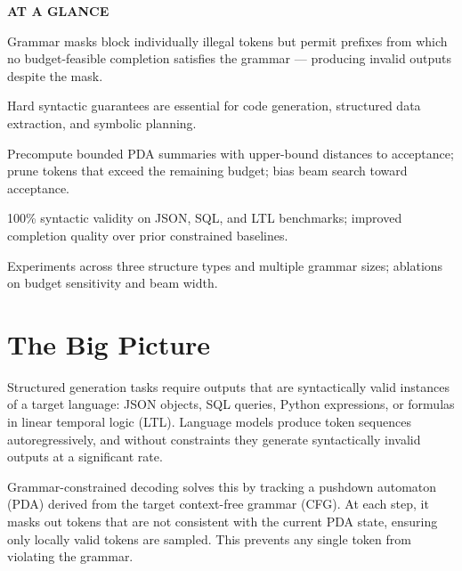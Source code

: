 \documentclass[10pt,twocolumn]{article}
\begin{document}
\begin{mdframed}[backgroundcolor=boxgray,linecolor=rulered,linewidth=1pt,
    innerleftmargin=6pt,innerrightmargin=6pt,
    innertopmargin=6pt,innerbottommargin=6pt]
\textbf{\small AT A GLANCE}\par\vspace{4pt}
\begin{description}[leftmargin=0pt,labelsep=4pt,itemsep=2pt,parsep=0pt,
    font=\small\bfseries]
  \item[Problem:] Grammar masks block individually illegal tokens but
    permit prefixes from which no budget-feasible completion satisfies
    the grammar — producing invalid outputs despite the mask.
  \item[Why it matters:] Hard syntactic guarantees are essential for
    code generation, structured data extraction, and symbolic planning.
  \item[Method:] Precompute bounded PDA summaries with upper-bound
    distances to acceptance; prune tokens that exceed the remaining
    budget; bias beam search toward acceptance.
  \item[Result:] 100\% syntactic validity on JSON, SQL, and LTL
    benchmarks; improved completion quality over prior constrained
    baselines.
  \item[Evidence:] Experiments across three structure types and
    multiple grammar sizes; ablations on budget sensitivity and beam width.
\end{description}
\end{mdframed}

\section{The Big Picture}

Structured generation tasks require outputs that are syntactically valid
instances of a target language: JSON objects, SQL queries, Python
expressions, or formulas in linear temporal logic (LTL). Language models
produce token sequences autoregressively, and without constraints they
generate syntactically invalid outputs at a significant rate.

Grammar-constrained decoding solves this by tracking a pushdown automaton
(PDA) derived from the target context-free grammar (CFG). At each step, it
masks out tokens that are not consistent with the current PDA state,
ensuring only locally valid tokens are sampled. This prevents any single
token from violating the grammar.
\end{document}
